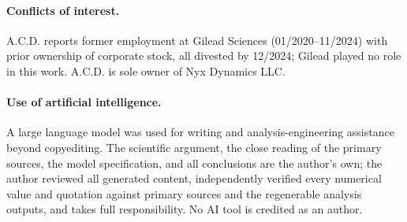 \documentclass[10pt,letterpaper]{article}
\begin{document}
\paragraph*{Conflicts of interest.} A.C.D. reports former employment at Gilead Sciences
(01/2020--11/2024) with prior ownership of corporate stock, all divested by 12/2024; Gilead played no
role in this work. A.C.D. is sole owner of Nyx Dynamics LLC.

\paragraph*{Use of artificial intelligence.} A large language model was used for writing and
analysis-engineering assistance beyond copyediting. The scientific argument, the close reading of the
primary sources, the model specification, and all conclusions are the author's own; the author
reviewed all generated content, independently verified every numerical value and quotation against
primary sources and the regenerable analysis outputs, and takes full responsibility. No AI tool is
credited as an author.

\nolinenumbers


\end{document}
